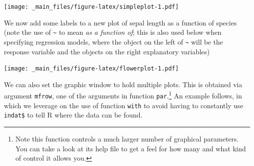 \documentclass[]{book}
\newenvironment{Shaded}{\begin{snugshade}}{\end{snugshade}}
\newcommand{\KeywordTok}[1]{\textcolor[rgb]{0.13,0.29,0.53}{\textbf{#1}}}
\newcommand{\DataTypeTok}[1]{\textcolor[rgb]{0.13,0.29,0.53}{#1}}
\newcommand{\StringTok}[1]{\textcolor[rgb]{0.31,0.60,0.02}{#1}}
\newcommand{\CommentTok}[1]{\textcolor[rgb]{0.56,0.35,0.01}{\textit{#1}}}
\newcommand{\OperatorTok}[1]{\textcolor[rgb]{0.81,0.36,0.00}{\textbf{#1}}}
\newcommand{\NormalTok}[1]{#1}
\let\rmarkdownfootnote\footnote%
\def\footnote{\protect\rmarkdownfootnote}
\theoremstyle{definition}
\theoremstyle{definition}
\theoremstyle{remark}
\begin{document}
\begin{Shaded}
\end{Shaded}

\texttt{[image: \_main\_files/figure-latex/simpleplot-1.pdf]}

We now add some labels to a new plot of sepal length as a function of
species (note the use of \texttt{\textasciitilde{}} to mean \emph{as a
function of}; this is also used below when specifying regression models,
where the object on the left of \texttt{\textasciitilde{}} will be the
response variable and the objects on the right explanatory variables)

\begin{Shaded}
\end{Shaded}

\texttt{[image: \_main\_files/figure-latex/flowerplot-1.pdf]}

We can also set the graphic window to hold multiple plots. This is
obtained via argument \texttt{mfrow}, one of the arguments in function
\texttt{par}.\footnote{Note this function controls a much larger number
  of graphical parameters. You can take a look at its help file to get a
  feel for how many and what kind of control it allows you.} An example
follows, in which we leverage on the use of function \texttt{with} to
avoid having to constantly use \texttt{indat\$} to tell R where the data
can be found.
\end{document}
